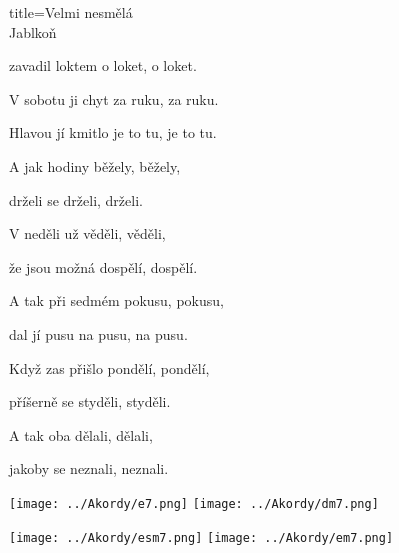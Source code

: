 \begin{song}{title=\predtitle\centering Velmi nesmělá \\\large Jablkoň  \vspace*{-0.3cm}}
\begin{centerjustified}
\begin{varwidth}[t]{0.48\textwidth}
	zavadil loktem o loket, o loket.

\end{varwidth}\mezisloupci\begin{varwidth}[t]{0.48\textwidth}\setlength{\parindent}{0.45cm}\vspace*{0.55cm}  %
\vspace*{-.185cm}
\sloka
	V sobotu ji chyt za ruku, za ruku.
	
	Hlavou jí kmitlo je to tu, je to tu.
	
	A jak hodiny běžely, běžely,
	
	drželi se drželi, drželi.


	
\sloka
	V neděli už věděli, věděli,

	že jsou možná dospělí, dospělí.
	
	A tak při sedmém pokusu, pokusu,
	
	dal jí pusu na pusu, na pusu.


\sloka
	Když zas přišlo pondělí, pondělí,
	
	příšerně se styděli, styděli.
	
	A tak oba dělali, dělali,
	
	jakoby se neznali, neznali.

\phantom{.}

\phantom{.}

 \texttt{[image: ../Akordy/e7.png]}
 \texttt{[image: ../Akordy/dm7.png]}

 \texttt{[image: ../Akordy/esm7.png]}
 \texttt{[image: ../Akordy/em7.png]}



\end{varwidth}

\end{centerjustified}
\setcounter{Slokočet}{0}
\end{song}
